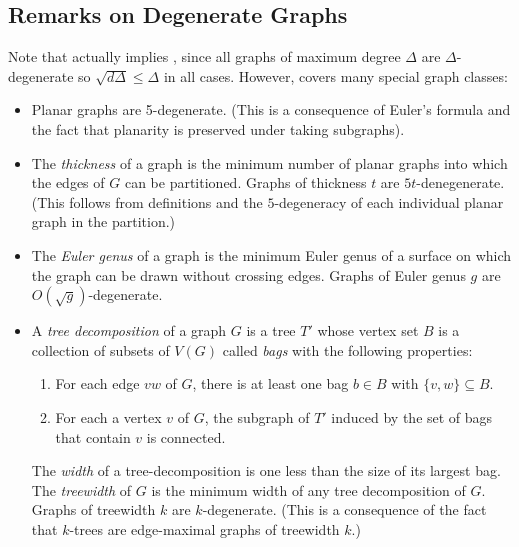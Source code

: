 \documentclass[lotsofwhite]{patmorin}
\begin{document}
\subsection{Remarks on Degenerate Graphs}

Note that  actually implies
, since all graphs of maximum degree $\Delta$
are $\Delta$-degenerate so $\sqrt{d\Delta}\le \Delta$ in all cases.
However,  covers many special
graph classes:

\begin{itemize}
  \item Planar graphs are 5-degenerate. (This is a consequence of Euler's
    formula and the fact that planarity is preserved under taking subgraphs).
  
  \item The \emph{thickness} of a graph is the minimum number of planar
    graphs into which the edges of $G$ can be partitioned. Graphs of
    thickness $t$ are $5t$-denegenerate.  (This follows from definitions
    and the $5$-degeneracy of each individual planar graph in the
    partition.)

  \item The \emph{Euler genus} of a graph is the minimum Euler genus of
    a surface on which the graph can be drawn without crossing edges.  Graphs of
    Euler genus $g$ are $O(\sqrt{g})$-degenerate.

  \item A \emph{tree decomposition} of a graph $G$ is a tree $T'$ whose
  vertex set $B$ is a collection of subsets of $V(G)$ called \emph{bags}
  with the following properties:
  \begin{enumerate}
    \item For each edge $vw$ of $G$, there is at least one bag $b\in B$
      with $\{v,w\}\subseteq B$.
    \item For each a vertex $v$ of $G$, the subgraph of $T'$ induced by
      the set of bags that contain $v$ is connected.
  \end{enumerate}
  The \emph{width} of a tree-decomposition is one less than the size
  of its largest bag.  The \emph{treewidth} of $G$ is the minimum
  width of any tree decomposition of $G$.
  Graphs of treewidth $k$ are $k$-degenerate. (This is a consequence
  of the fact that $k$-trees are edge-maximal graphs of treewidth $k$.)
\end{itemize} 
\end{document}

